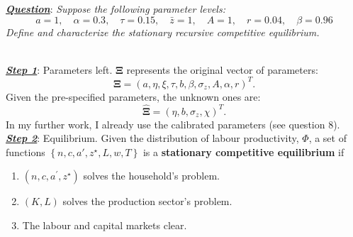 \colorbox{BurntOrange!25}{ \parbox{\textwidth}{
    \textbf{\textit{\underline{Question}}}:
\textit{
    Suppose the following parameter levels:
$$
a=1, \quad \alpha=0.3, \quad \tau=0.15, \quad \bar{z}=1, \quad A=1, \quad r=0.04, \quad \beta=0.96
$$
Define and characterize the stationary recursive competitive equilibrium.
}}}\\

\colorbox{BurntOrange!25}{\textbf{\textit{\underline{Step 1}}}: Parameters left.} 
$\boldsymbol{\Xi}$ represents the original vector of parameters:
\begin{equation}
   \boldsymbol{\Xi}= \left(a, \eta, \xi, \tau, b, \beta, \sigma_z, A, \alpha, r \right)^T.
\end{equation}
Given the pre-specified parameters, the unknown ones are:
\begin{equation}
    \hat{\boldsymbol{\Xi}}= \left(\eta, b, \sigma_z, \chi \right)^T.
\end{equation}
In my further work, I already use the calibrated parameters (see question 8).\\

\colorbox{BurntOrange!25}{\textbf{\textit{\underline{Step 2}}}: Equilibrium.}
Given the distribution of labour productivity, $\Phi$, a set of functions $\left\{n,c,a',z^\star,L,w,T \right\}$ is a \textcolor{BurntOrange}{\textbf{stationary competitive equilibrium}} if
\begin{enumerate}
    \item $\left(n,c,a^\prime, z^\star \right)$ solves the household's problem.
    \item $(K,L)$ solves the production sector's problem. 
    \item The labour and capital markets clear. 
\end{enumerate}  

